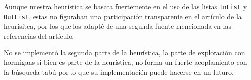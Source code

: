 \documentclass[letter,10pt]{article}
\theoremstyle{definition}
\begin{document}
Aunque nuestra heurística se basara fuertemente en el uso de las listas \texttt{InList} y \texttt{OutList}, estas no figuraban una participación transparente en el artículo de la heurísitca, por los que los adapté de una segunda fuente mencionada en las referencias del artículo.

No se implementó la segunda parte de la heurística, la parte de exploración con hormigaas si bien es parte de la heurística, no forma un fuerte acoplamiento con la búsqueda tabú por lo que su implementación puede hacerse en un futuro.
\medskip

\nocite{*}

\end{document}
